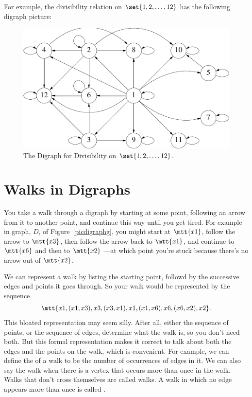 For example, the divisibility relation on $\set{1,2,\dots,12}$ has the following
digraph picture: 
\begin{figure}[h]
\centering \includegraphics{figures/divisibility.pdf}
\caption{The Digraph for Divisibility on $\set{1,2,\dots,12}$.}
\label{fig:divisibility-digraph}
\end{figure}



\section{Walks in Digraphs}\label{walks}

You take a walk through a digraph by starting at some point, following an
arrow from it to another point, and continue this way until you get tired.
For example in graph, $D$, of Figure~\ref{picdigraphg}, you might start at
$\mtt{x1}$, follow the arrow to $\mtt{x3}$, then follow the arrow back to
$\mtt{x1}$, and continue to $\mtt{x6}$ and then to $\mtt{x2}$ ---at which
point you're stuck because there's no arrow out of $\mtt{x2}$.

We can represent a walk by listing the starting point, followd by the successive
edges and points it goes through.  So your walk would be represented by the
sequence
\[
\mtt{x1, (x1,x3), x3, (x3,x1), x1, (x1,x6),x6,(x6,x2),x2}.
\]
This bloated representation may seem silly.  After all, either the sequence of
points, or the sequence of edges, determine what the walk is, so you don't
need both.  But this formal representation makes it correct to talk about
both the edges and the points on the walk,  which is convenient.  For
example, we can define the  of a walk to be the number of
occurrences of edges in it.  We can also say the walk  when
there is a vertex that occurs more than once in the walk.
Walks that don't cross themselves are called  walks.
A walk in which no edge appears more than once is called
.

